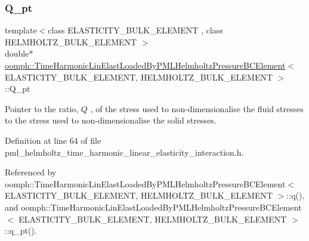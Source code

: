 \mbox{\label{classoomph_1_1TimeHarmonicLinElastLoadedByPMLHelmholtzPressureBCElement_aa45224393afa639869972fdf77384e63}} 
\subsubsection{\texorpdfstring{Q\+\_\+pt}{Q\_pt}}
{\footnotesize\ttfamily template$<$class E\+L\+A\+S\+T\+I\+C\+I\+T\+Y\+\_\+\+B\+U\+L\+K\+\_\+\+E\+L\+E\+M\+E\+NT , class H\+E\+L\+M\+H\+O\+L\+T\+Z\+\_\+\+B\+U\+L\+K\+\_\+\+E\+L\+E\+M\+E\+NT $>$ \\
double$\ast$ \hyperlink{classoomph_1_1TimeHarmonicLinElastLoadedByPMLHelmholtzPressureBCElement}{oomph\+::\+Time\+Harmonic\+Lin\+Elast\+Loaded\+By\+P\+M\+L\+Helmholtz\+Pressure\+B\+C\+Element}$<$ E\+L\+A\+S\+T\+I\+C\+I\+T\+Y\+\_\+\+B\+U\+L\+K\+\_\+\+E\+L\+E\+M\+E\+NT, H\+E\+L\+M\+H\+O\+L\+T\+Z\+\_\+\+B\+U\+L\+K\+\_\+\+E\+L\+E\+M\+E\+NT $>$\+::Q\+\_\+pt\hspace{0.3cm}{\ttfamily [protected]}}



Pointer to the ratio, $ Q $ , of the stress used to non-\/dimensionalise the fluid stresses to the stress used to non-\/dimensionalise the solid stresses. 



Definition at line 64 of file pml\+\_\+helmholtz\+\_\+time\+\_\+harmonic\+\_\+linear\+\_\+elasticity\+\_\+interaction.\+h.



Referenced by oomph\+::\+Time\+Harmonic\+Lin\+Elast\+Loaded\+By\+P\+M\+L\+Helmholtz\+Pressure\+B\+C\+Element$<$ E\+L\+A\+S\+T\+I\+C\+I\+T\+Y\+\_\+\+B\+U\+L\+K\+\_\+\+E\+L\+E\+M\+E\+N\+T, H\+E\+L\+M\+H\+O\+L\+T\+Z\+\_\+\+B\+U\+L\+K\+\_\+\+E\+L\+E\+M\+E\+N\+T $>$\+::q(), and oomph\+::\+Time\+Harmonic\+Lin\+Elast\+Loaded\+By\+P\+M\+L\+Helmholtz\+Pressure\+B\+C\+Element$<$ E\+L\+A\+S\+T\+I\+C\+I\+T\+Y\+\_\+\+B\+U\+L\+K\+\_\+\+E\+L\+E\+M\+E\+N\+T, H\+E\+L\+M\+H\+O\+L\+T\+Z\+\_\+\+B\+U\+L\+K\+\_\+\+E\+L\+E\+M\+E\+N\+T $>$\+::q\+\_\+pt().

